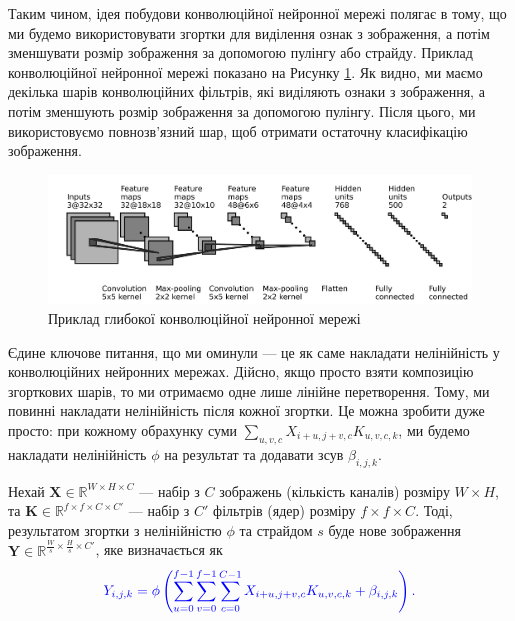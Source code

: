 Таким чином, ідея побудови конволюційної нейронної мережі полягає в тому, що ми
будемо використовувати згортки для виділення ознак з зображення, а потім
зменшувати розмір зображення за допомогою пулінгу або страйду. Приклад
конволюційної нейронної мережі показано на Рисунку \ref{fig:convnet}. Як видно,
ми маємо декілька шарів конволюційних фільтрів, які виділяють ознаки з
зображення, а потім зменшують розмір зображення за допомогою пулінгу. Після
цього, ми використовуємо повнозв'язний шар, щоб отримати остаточну класифікацію
зображення. 

\begin{figure}
    \centering
    \includegraphics[width=1.0\linewidth]{figures/convolutions/convnet_fig.png}
    \caption{Приклад глибокої конволюційної нейронної мережі}
    \label{fig:convnet}
\end{figure}

Єдине ключове питання, що ми оминули --- це як саме накладати нелінійність 
у конволюційних нейронних мережах. Дійсно, якщо просто взяти композицію 
згорткових шарів, то ми отримаємо одне лише лінійне перетворення.
Тому, ми повинні накладати нелінійність після кожної згортки. Це можна 
зробити дуже просто: при кожному обрахунку суми $\sum_{u,v,c}X_{i+u,j+v,c}K_{u,v,c,k}$,
ми будемо накладати нелінійність $\phi$ на результат та додавати 
зсув $\beta_{i,j,k}$.
\begin{definition}
    Нехай $\boldsymbol{X} \in \mathbb{R}^{W \times H \times C}$ --- набір з $C$
    зображень (кількість каналів) розміру $W \times H$, та $\boldsymbol{K} \in
    \mathbb{R}^{f \times f \times C \times C'}$ --- набір з $C'$ фільтрів (ядер)
    розміру $f \times f \times C$. Тоді, результатом згортки з нелінійністю
    $\phi$ та страйдом $s$ буде нове зображення $\boldsymbol{Y} \in
    \mathbb{R}^{\frac{W}{s} \times \frac{H}{s} \times C'}$, яке визначається як
    \begin{equation}
        \textcolor{blue}{Y_{i,j,k} = \phi\left(\sum_{u=0}^{f-1} \sum_{v=0}^{f-1} \sum_{c=0}^{C-1} X_{i+u,j+v,c} K_{u,v,c,k} + \beta_{i,j,k}\right).}
    \end{equation}
\end{definition}


